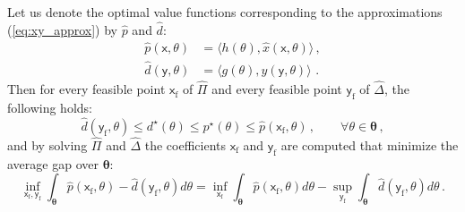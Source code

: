 \documentclass{article}
\newcommand{\commentGP}[1]{\noindent \textcolor{blue}{\emph{$<\,$GP: #1$\,>$}}}%
\newcommand{\opt}{\star}                    %
\newcommand{\feas}{\mathrm{f}}              %
\newcommand{\ppar}{\theta}                          %
\newcommand{\Ppar}{{\bm{\theta}}}                   %
\newcommand{\calF}{\mathcal{F}}                     %
\newcommand{\cx}{\textsf{x}}        %
\newcommand{\cy}{\textsf{y}}        %
\begin{document}
Let us denote the optimal value functions corresponding to the approximations (\ref{eq:xy_approx}) by $\hat{p}$ and $\hat{d}$:
\begin{align*}
\hat{p}(\cx,\ppar) &= \langle h(\ppar), \hat{x}(\cx,\ppar) \rangle \,,\\%
\hat{d}(\cy,\ppar) &= \langle g(\ppar), \hat{y}(\cy,\ppar) \rangle \,  \,.%
\end{align*}
Then for every feasible point $\cx_\feas$ of $\hat{\Pi}$ and every feasible point $\cy_\feas$ of $\hat{\Delta}$, the following holds:
\[ \hat{d}(\cy_\feas,\ppar) \leq d^\opt(\ppar) \leq p^\opt(\ppar) \leq \hat{p}(\cx_\feas,\ppar)\,,\qquad\forall\ppar\in\Ppar\,,%
\]
and by solving $\hat{\Pi}$ and $\hat{\Delta}$ the coefficients $\cx_\feas$ and $\cy_\feas$ are computed that minimize the average gap over $\Ppar$:
\[ \inf_{\cx_\feas,\cy_\feas} \int_{\Ppar} \hat{p}(\cx_\feas,\ppar) - \hat{d}(\cy_\feas,\ppar) d\ppar = %
   \inf_{\cx_\feas} \int_{\Ppar} \hat{p}(\cx_\feas,\ppar) d\ppar - \sup_{\cy_\feas} \int_{\Ppar} \hat{d}(\cy_\feas,\ppar) d\ppar\,.%
\]
\end{document}
